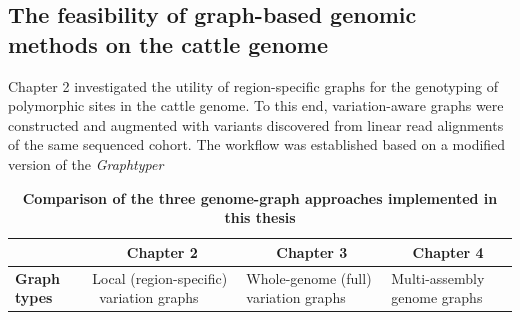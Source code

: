 \documentclass[../main.tex]{subfiles}
\begin{document}
\subsection*{The feasibility of graph-based genomic methods on the cattle genome}


Chapter 2 investigated the utility of region-specific graphs for the genotyping of polymorphic sites in the cattle genome. To this end, variation-aware graphs were constructed and augmented with variants discovered from linear read alignments of the same sequenced cohort. The workflow was established based on a modified version of the \emph{Graphtyper} 


\begin{landscape}
   \thispagestyle{noheadi}
   \begin{table}
      \centering
      \footnotesize
      \caption[Comparison of the genome graph implementations]{\textbf{Comparison of the three genome-graph approaches implemented in this thesis}}
      \begin{tabular}{|l|l|l|l|} 
      \cline{2-4}
      \multicolumn{1}{l|}{~}                                                                              & \multicolumn{1}{c|}{\textbf{Chapter 2}}                                                                                                                                                                                                                                 & \multicolumn{1}{c|}{\textbf{Chapter 3}}                                                                                                                                                                                   & \multicolumn{1}{c|}{\textbf{Chapter 4}}                                                                                                                                                                                                                            \\ 
      \hline
      \textbf{Graph types}                                                                                     & Local (region-specific) ~variation graphs                                                                                                                                                                                                                               & Whole-genome (full) variation graphs                                                                                                                                                                                       & Multi-assembly genome graphs                                                                                                                                                                                                                                       \\ 

\end{tabular}
\end{table}
\end{landscape}
\end{document}
